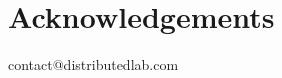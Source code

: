 \documentclass{zkdl-template}
\begin{document}
    \section{Acknowledgements}
    


     
    


    \newpage
    \pagestyle{empty}

    \ifodd\value{page}
        \newpage
    \fi

    \vspace*{\fill}

    \begin{center}
        contact@distributedlab.com
    \end{center}

    \vspace*{\fill}
\end{document}
